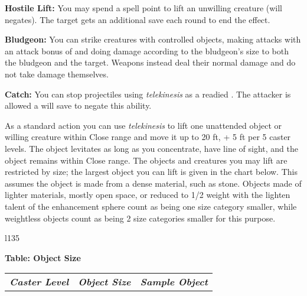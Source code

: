 {	\par \textbf{Hostile Lift:} You may spend a spell point to lift an unwilling creature (will negates). The target gets an additional save each round to end the effect.
	\par \textbf{Bludgeon:} You can strike creatures with controlled objects, making attacks with an attack bonus of \domath{\value{charBABCount} + \value{charCastingModCount}} and doing damage according to the bludgeon's size to both the bludgeon and the target. Weapons instead deal their normal damage and do not take damage themselves.
	\par \textbf{Catch:} You can stop projectiles using \textit{telekinesis} as a readied . The attacker is allowed a will save to negate this ability.
}{
As a standard action you can use \textit{telekinesis} to lift one unattended object or willing creature within Close range and move it up to 20 ft, + 5 ft per 5 caster levels. The object levitates as long as you concentrate, have line of sight, and the object remains within Close range. The objects and creatures you may lift are restricted by size; the largest object you can lift is given in the chart below. This assumes the object is made from a dense material, such as stone. Objects made of lighter materials, mostly open space, or reduced to 1/2 weight with the lighten talent of the enhancement sphere count as being one size category smaller, while weightless objects count as being 2 size categories smaller for this purpose.
\begin{wraptable}[11]{l}{135\unitlength}
	\raggedright\textbf{Table: Object Size}
	\small
	\begin{tabular}{ccc}
		\rowcolor{gray!50}
		\textbf{\textit{Caster Level}}& \textbf{\textit{Object Size}} & \textbf{\textit{Sample Object}}\\

\end{tabular}
\end{wraptable}}
